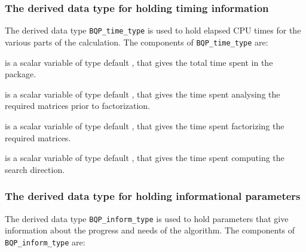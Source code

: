 \documentclass{galahad}
\newcommand{\packagename}{BQP}
\begin{document}

\subsubsection{The derived data type for holding timing 
 information}\label{typetime}
The derived data type 
{\tt \packagename\_time\_type} 
is used to hold elapsed CPU times for the various parts of the calculation.
The components of 
{\tt \packagename\_time\_type} 
are:
\begin{description}
 is a scalar variable of type default \real, that gives
 the total time spent in the package.

 is a scalar variable of type default \real, that gives
 the time spent analysing the required matrices prior to factorization.

 is a scalar variable of type default \real, that gives
 the time spent factorizing the required matrices.

 is a scalar variable of type default \real, that gives
 the time spent computing the search direction.

\end{description}


\subsubsection{The derived data type for holding informational
 parameters}\label{typeinform}
The derived data type 
{\tt \packagename\_inform\_type} 
is used to hold parameters that give information about the progress and needs 
of the algorithm. The components of 
{\tt \packagename\_inform\_type} 
are:
\end{document}
